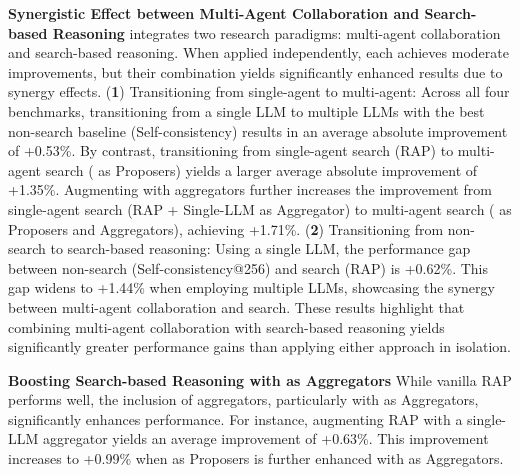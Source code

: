 \textbf{Synergistic Effect between Multi-Agent Collaboration and Search-based Reasoning}\hspace{5pt}
\mosa{} integrates two research paradigms: multi-agent collaboration and search-based reasoning. 
When applied independently, each achieves moderate improvements, but their combination yields significantly enhanced results due to synergy effects.
(\textbf{1}) Transitioning from single-agent to multi-agent:
Across all four benchmarks, transitioning from a single LLM to multiple LLMs with the best non-search baseline (Self-consistency) results in an average absolute improvement of +0.53\%. 
By contrast, transitioning from single-agent search (RAP) to multi-agent search (\mosa{} as Proposers) yields a larger average absolute improvement of +1.35\%. Augmenting with aggregators further increases the improvement from single-agent search (RAP + Single-LLM as Aggregator) to multi-agent search (\mosa{} as Proposers and Aggregators), achieving +1.71\%.
(\textbf{2}) Transitioning from non-search to search-based reasoning:
Using a single LLM, the performance gap between non-search (Self-consistency@256) and search (RAP) is +0.62\%. 
This gap widens to +1.44\% when employing multiple LLMs, showcasing the synergy between multi-agent collaboration and search. 
These results highlight that combining multi-agent collaboration with search-based reasoning yields significantly greater performance gains than applying either approach in isolation.





\textbf{Boosting Search-based Reasoning with \mosa{} as Aggregators}
\hspace{5pt}
While vanilla RAP performs well, the inclusion of aggregators, particularly with \mosa{} as Aggregators, significantly enhances performance. 
For instance, augmenting RAP with a single-LLM aggregator yields an average improvement of +0.63\%. 
This improvement increases to +0.99\% when \mosa{} as Proposers is further enhanced with \mosa{} as Aggregators.


